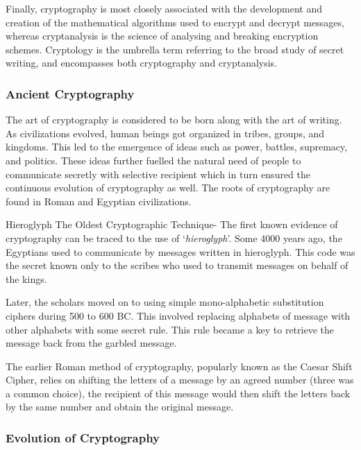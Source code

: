 \documentclass[british]{article}
\begin{document}
Finally, cryptography is most closely associated with the development
and creation of the mathematical algorithms used to encrypt and decrypt
messages, whereas cryptanalysis is the science of analysing and breaking
encryption schemes. Cryptology is the umbrella term referring to the
broad study of secret writing, and encompasses both cryptography and
cryptanalysis.

\subsubsection{Ancient Cryptography}

The art of cryptography is considered to be born along with the art
of writing. As civilizations evolved, human beings got organized in
tribes, groups, and kingdoms. This led to the emergence of ideas such
as power, battles, supremacy, and politics. These ideas further fuelled
the natural need of people to communicate secretly with selective
recipient which in turn ensured the continuous evolution of cryptography
as well. The roots of cryptography are found in Roman and Egyptian
civilizations.

Hieroglyph \textminus{} The Oldest Cryptographic Technique- The first
known evidence of cryptography can be traced to the use of `\textit{hieroglyph}'.
Some 4000 years ago, the Egyptians used to communicate by messages
written in hieroglyph. This code was the secret known only to the
scribes who used to transmit messages on behalf of the kings.

Later, the scholars moved on to using simple mono-alphabetic substitution
ciphers during 500 to 600 BC. This involved replacing alphabets of
message with other alphabets with some secret rule. This rule became
a key to retrieve the message back from the garbled message.

The earlier Roman method of cryptography, popularly known as the Caesar
Shift Cipher, relies on shifting the letters of a message by an agreed
number (three was a common choice), the recipient of this message
would then shift the letters back by the same number and obtain the
original message.

\subsubsection{Evolution of Cryptography}
\end{document}
